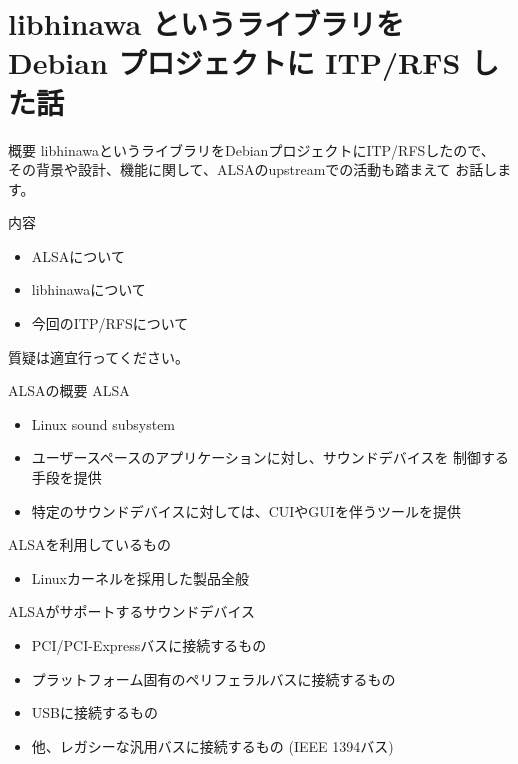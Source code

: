\section{libhinawa というライブラリを Debian プロジェクトに ITP/RFS した話}

\begin{frame}{概要}
  libhinawaというライブラリをDebianプロジェクトにITP/RFSしたので、
  その背景や設計、機能に関して、ALSAのupstreamでの活動も踏まえて
  お話します。
\end{frame}

\begin{frame}{内容}
  \begin{itemize}
  \item ALSAについて
  \item libhinawaについて
  \item 今回のITP/RFSについて
  \end{itemize}
  質疑は適宜行ってください。
\end{frame}

\begin{frame}{ALSAの概要}
  ALSA
  \begin{itemize}
  \item Linux sound subsystem
  \item ユーザースペースのアプリケーションに対し、サウンドデバイスを
        制御する手段を提供
  \item 特定のサウンドデバイスに対しては、CUIやGUIを伴うツールを提供
  \end{itemize}
  ALSAを利用しているもの
  \begin{itemize}
  \item Linuxカーネルを採用した製品全般
  \end{itemize}
\end{frame}

\begin{frame}{ALSAがサポートするサウンドデバイス}
  \begin{itemize}
  \item PCI/PCI-Expressバスに接続するもの
  \item プラットフォーム固有のペリフェラルバスに接続するもの
  \item USBに接続するもの
  \item 他、レガシーな汎用バスに接続するもの (IEEE 1394バス)
  \end{itemize}
\end{frame}

